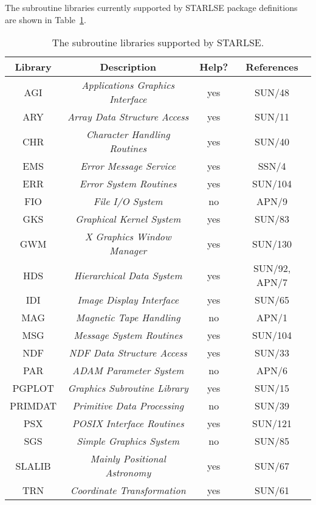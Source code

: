 The subroutine libraries currently supported by STARLSE package definitions
are shown in Table~\ref{table:status}. 

\begin{table}
\begin{center}
\begin{tabular}{|c|c|c|c|}
\hline
{\bf Library} & {\bf Description} & {\bf Help?} & {\bf References}\\
\hline \hline
AGI & {\em Applications Graphics Interface} & yes & SUN/48 \\
ARY & {\em Array Data Structure Access} & yes & SUN/11 \\
CHR & {\em Character Handling Routines} & yes & SUN/40 \\
EMS & {\em Error Message Service}    & yes & SSN/4 \\
ERR & {\em Error System Routines}    & yes & SUN/104 \\
FIO & {\em File I/O System}          & no & APN/9 \\
GKS & {\em Graphical Kernel System}  & yes & SUN/83 \\
GWM & {\em X Graphics Window Manager}& yes & SUN/130 \\
HDS & {\em Hierarchical Data System} & yes & SUN/92, APN/7 \\
IDI & {\em Image Display Interface}  & yes & SUN/65 \\
MAG & {\em Magnetic Tape Handling} & no & APN/1 \\
MSG & {\em Message System Routines}  & yes & SUN/104 \\
NDF & {\em NDF Data Structure Access} & yes & SUN/33 \\
PAR & {\em ADAM Parameter System}    & no & APN/6 \\
PGPLOT & {\em Graphics Subroutine Library} & yes & SUN/15 \\
PRIMDAT & {\em Primitive Data Processing} & no & SUN/39 \\
PSX & {\em POSIX Interface Routines} & yes & SUN/121 \\
SGS & {\em Simple Graphics System}   & no & SUN/85 \\
SLALIB & {\em Mainly Positional Astronomy} & yes & SUN/67 \\
TRN & {\em Coordinate Transformation} & yes & SUN/61 \\
\hline
\end{tabular}
\caption{The subroutine libraries supported by STARLSE.}
\label{table:status}
\end{center}
\end{table}

